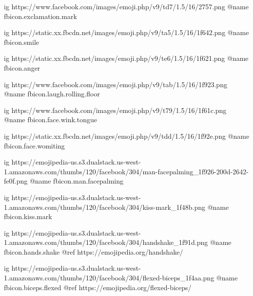  
 
 
 
 

\ifcmt




  ig https://www.facebook.com/images/emoji.php/v9/td7/1.5/16/2757.png
  @name fbicon.exclamation.mark

  ig https://static.xx.fbcdn.net/images/emoji.php/v9/ta5/1.5/16/1f642.png
  @name fbicon.smile

  ig https://static.xx.fbcdn.net/images/emoji.php/v9/te6/1.5/16/1f621.png
  @name fbicon.anger

  ig https://www.facebook.com/images/emoji.php/v9/tab/1.5/16/1f923.png
  @name fbicon.laugh.rolling.floor

  ig https://www.facebook.com/images/emoji.php/v9/t79/1.5/16/1f61c.png
  @name fbicon.face.wink.tongue

  ig https://static.xx.fbcdn.net/images/emoji.php/v9/tdd/1.5/16/1f92e.png
  @name fbicon.face.womiting

  ig https://emojipedia-us.s3.dualstack.us-west-1.amazonaws.com/thumbs/120/facebook/304/man-facepalming_1f926-200d-2642-fe0f.png
  @name fbicon.man.facepalming

  ig https://emojipedia-us.s3.dualstack.us-west-1.amazonaws.com/thumbs/120/facebook/304/kiss-mark_1f48b.png
  @name fbicon.kiss.mark

  ig https://emojipedia-us.s3.dualstack.us-west-1.amazonaws.com/thumbs/120/facebook/304/handshake_1f91d.png
  @name fbicon.hands.shake
  @ref https://emojipedia.org/handshake/

  ig https://emojipedia-us.s3.dualstack.us-west-1.amazonaws.com/thumbs/120/facebook/304/flexed-biceps_1f4aa.png
  @name fbicon.biceps.flexed
  @ref https://emojipedia.org/flexed-biceps/

